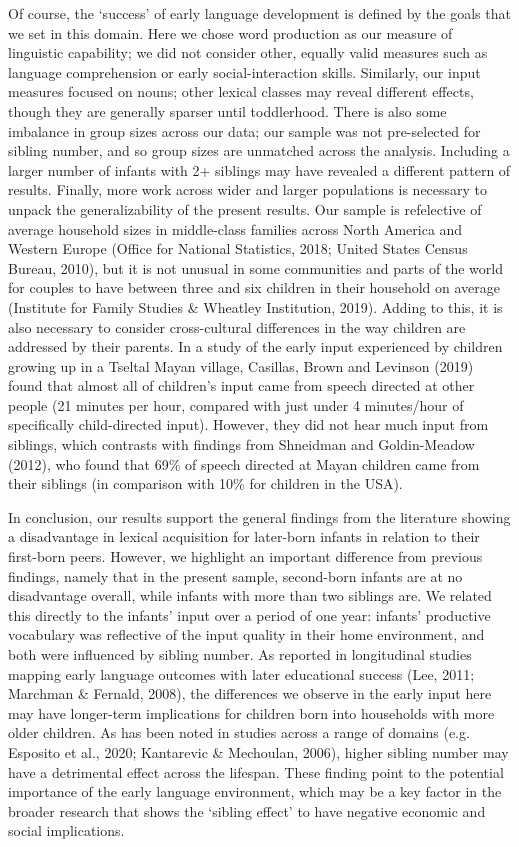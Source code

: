 \documentclass[
  english,
  man,floatsintext]{apa6}
\begin{document}
Of course, the `success' of early language development is defined by the goals that we set in this domain. Here we chose word production as our measure of linguistic capability; we did not consider other, equally valid measures such as language comprehension or early social-interaction skills. Similarly, our input measures focused on nouns; other lexical classes may reveal different effects, though they are generally sparser until toddlerhood. There is also some imbalance in group sizes across our data; our sample was not pre-selected for sibling number, and so group sizes are unmatched across the analysis. Including a larger number of infants with 2+ siblings may have revealed a different pattern of results. Finally, more work across wider and larger populations is necessary to unpack the generalizability of the present results. Our sample is refelective of average household sizes in middle-class families across North America and Western Europe (Office for National Statistics, 2018; United States Census Bureau, 2010), but it is not unusual in some communities and parts of the world for couples to have between three and six children in their household on average (Institute for Family Studies \& Wheatley Institution, 2019). Adding to this, it is also necessary to consider cross-cultural differences in the way children are addressed by their parents. In a study of the early input experienced by children growing up in a Tseltal Mayan village, Casillas, Brown and Levinson (2019) found that almost all of children's input came from speech directed at other people (21 minutes per hour, compared with just under 4 minutes/hour of specifically child-directed input). However, they did not hear much input from siblings, which contrasts with findings from Shneidman and Goldin-Meadow (2012), who found that 69\% of speech directed at Mayan children came from their siblings (in comparison with 10\% for children in the USA).

In conclusion, our results support the general findings from the literature showing a disadvantage in lexical acquisition for later-born infants in relation to their first-born peers. However, we highlight an important difference from previous findings, namely that in the present sample, second-born infants are at no disadvantage overall, while infants with more than two siblings are. We related this directly to the infants' input over a period of one year: infants' productive vocabulary was reflective of the input quality in their home environment, and both were influenced by sibling number. As reported in longitudinal studies mapping early language outcomes with later educational success (Lee, 2011; Marchman \& Fernald, 2008), the differences we observe in the early input here may have longer-term implications for children born into households with more older children. As has been noted in studies across a range of domains (e.g. Esposito et al., 2020; Kantarevic \& Mechoulan, 2006), higher sibling number may have a detrimental effect across the lifespan. These finding point to the potential importance of the early language environment, which may be a key factor in the broader research that shows the `sibling effect' to have negative economic and social implications.
\end{document}

